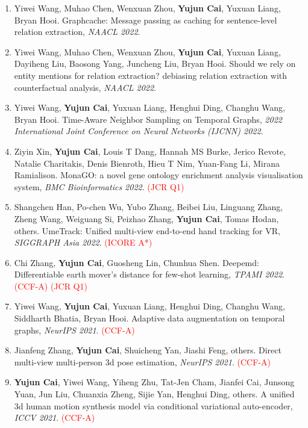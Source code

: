 \documentclass[UTF8,a4paper,11pt,fontset=fandol]{ctexart}
\begin{document}
\begin{enumerate}
\item Yiwei Wang, Muhao Chen, Wenxuan Zhou, \textbf{Yujun Cai}, Yuxuan Liang, Bryan Hooi. Graphcache: Message passing as caching for sentence-level relation extraction, \textit{NAACL 2022}.

\item Yiwei Wang, Muhao Chen, Wenxuan Zhou, \textbf{Yujun Cai}, Yuxuan Liang, Dayiheng Liu, Baosong Yang, Juncheng Liu, Bryan Hooi. Should we rely on entity mentions for relation extraction? debiasing relation extraction with counterfactual analysis, \textit{NAACL 2022}.

\item Yiwei Wang, \textbf{Yujun Cai}, Yuxuan Liang, Henghui Ding, Changhu Wang, Bryan Hooi. Time-Aware Neighbor Sampling on Temporal Graphs, \textit{2022 International Joint Conference on Neural Networks (IJCNN) 2022}.

\item Ziyin Xin, \textbf{Yujun Cai}, Louis T Dang, Hannah MS Burke, Jerico Revote, Natalie Charitakis, Denis Bienroth, Hieu T Nim, Yuan-Fang Li, Mirana Ramialison. MonaGO: a novel gene ontology enrichment analysis visualisation system, \textit{BMC Bioinformatics 2022}. \textcolor{red}{(JCR Q1)}

\item Shangchen Han, Po-chen Wu, Yubo Zhang, Beibei Liu, Linguang Zhang, Zheng Wang, Weiguang Si, Peizhao Zhang, \textbf{Yujun Cai}, Tomas Hodan, others. UmeTrack: Unified multi-view end-to-end hand tracking for VR, \textit{SIGGRAPH Asia 2022}. \textcolor{red}{(ICORE A*)}

\item Chi Zhang, \textbf{Yujun Cai}, Guosheng Lin, Chunhua Shen. Deepemd: Differentiable earth mover's distance for few-shot learning, \textit{TPAMI 2022}. \textcolor{red}{(CCF-A)} \textcolor{red}{(JCR Q1)}

\item Yiwei Wang, \textbf{Yujun Cai}, Yuxuan Liang, Henghui Ding, Changhu Wang, Siddharth Bhatia, Bryan Hooi. Adaptive data augmentation on temporal graphs, \textit{NeurIPS 2021}. \textcolor{red}{(CCF-A)}

\item Jianfeng Zhang, \textbf{Yujun Cai}, Shuicheng Yan, Jiashi Feng, others. Direct multi-view multi-person 3d pose estimation, \textit{NeurIPS 2021}. \textcolor{red}{(CCF-A)}

\item \textbf{Yujun Cai}, Yiwei Wang, Yiheng Zhu, Tat-Jen Cham, Jianfei Cai, Junsong Yuan, Jun Liu, Chuanxia Zheng, Sijie Yan, Henghui Ding, others. A unified 3d human motion synthesis model via conditional variational auto-encoder, \textit{ICCV 2021}. \textcolor{red}{(CCF-A)}


\end{enumerate}
\end{document}
